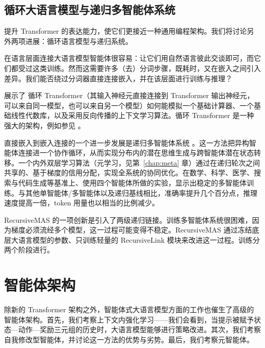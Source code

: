 
\subsection{循环大语言模型与递归多智能体系统}
提升 Transformer 的表达能力，使它们更接近一种通用编程架构。我们将讨论另外两项进展：循环语言模型与递归系统。

在语言层面连接大语言模型智能体很容易：让它们用自然语言彼此交谈即可，而它们都受过这类训练。然而这需要许多（去）分词步骤，既耗时，又在嵌入之间引入差异。我们能否绕过分词器直接连接嵌入，并在该层面进行训练与推理？


\citet{giannou2023looped}
展示了 %
循环 Transformer（其输入神经元直接连接到 Transformer 输出神经元，可以来自同一模型，也可以来自另一个模型）如何能模拟一个基础计算器、一个基础线性代数库，以及采用反向传播的上下文学习算法。循环 Transformer 是一种强大的架构，例如参见 \citet{yang2023looped,saunshi2025reasoning,zhu2025scaling}。

直接嵌入到嵌入连接的一个进一步发展是递归多智能体系统 \citep{yang2026recursive}。这一方法把异构智能体连接进一个协作循环，从而实现分布内的潜在思维生成与跨智能体潜在状态转移。一个内外双层学习算法（元学习，见第~\ref{chap:meta} 章）通过在递归轮次之间共享的、基于梯度的信用分配，实现全系统的协同优化。在数学、科学、医学、搜索与代码生成等基准上、使用四个智能体所做的实验，显示出稳定的多智能体训练。与其他单智能体/多智能体以及递归基线相比，准确率提升几个百分点，推理速度提高一倍，token 用量也以相当的比例减少。

RecursiveMAS 的一项创新是引入了两级递归链接。训练多智能体系统很困难，因为梯度必须流经多个模型，这一过程可能变得不稳定。RecursiveMAS 通过冻结底层大语言模型的参数、只训练轻量的 RecursiveLink 模块来改进这一过程。训练分两个阶段进行。


\section{智能体架构}
除新的 Transformer 架构之外，智能体式大语言模型方面的工作也催生了高级的智能体架构。首先，我们考察上下文内强化学习——我们会看到，当提示被赋予状态—动作—奖励三元组的历史时，大语言模型能够进行策略改进。其次，我们考察自我修改型智能体，并讨论这一方法的优势与劣势。最后，我们考察元智能体。



